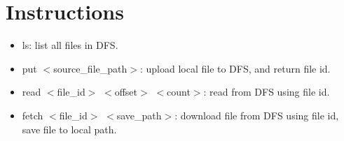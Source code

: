 \documentclass{article}
\begin{document}
\section{Instructions}
\begin{itemize}
    \item ls: list all files in DFS.
    \item put $<$source\_file\_path$>$: upload local file to DFS, and return file id.
    \item read $<$file\_id$>$ $<$offset$>$ $<$count$>$: read from DFS using file id.
    \item fetch $<$file\_id$>$ $<$save\_path$>$: download file from DFS using file id, save file to local path.
\end{itemize}
\end{document}
